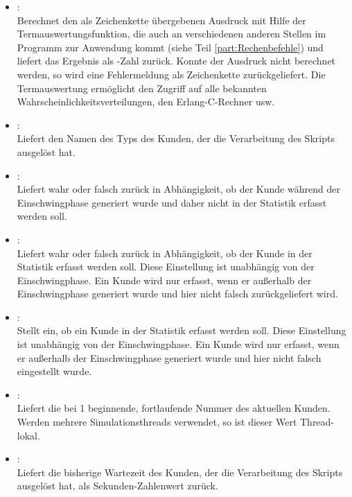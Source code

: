 \begin{itemize}

\item
{}:\\
Berechnet den als Zeichenkette übergebenen Ausdruck mit Hilfe der Termauswertungsfunktion, die
auch an verschiedenen anderen Stellen im Programm zur Anwendung kommt (siehe Teil \ref{part:Rechenbefehle}) und liefert das Ergebnis
als -Zahl zurück. Konnte der Ausdruck nicht berechnet werden, so wird eine Fehlermeldung als
Zeichenkette zurückgeliefert. Die Termauswertung ermöglicht den Zugriff auf alle bekannten
Wahrscheinlichkeitsverteilungen, den Erlang-C-Rechner usw.

\item
{}:\\
Liefert den Namen des Typs des Kunden, der die Verarbeitung des Skripts ausgelöst hat.
    
\item
{}:\\
Liefert wahr oder falsch zurück in Abhängigkeit, ob der Kunde während der Einschwingphase generiert wurde und
daher nicht in der Statistik erfasst werden soll.
  
\item
{}:\\
Liefert wahr oder falsch zurück in Abhängigkeit, ob der Kunde in der Statistik erfasst werden soll.
Diese Einstellung ist unabhängig von der Einschwingphase. Ein Kunde wird nur erfasst, wenn er außerhalb
der Einschwingphase generiert wurde und hier nicht falsch zurückgeliefert wird.
  
\item
{}:\\
Stellt ein, ob ein Kunde in der Statistik erfasst werden soll.
Diese Einstellung ist unabhängig von der Einschwingphase. Ein Kunde wird nur erfasst, wenn er außerhalb
der Einschwingphase generiert wurde und hier nicht falsch eingestellt wurde.
  
\item
{}:\\
Liefert die bei 1 beginnende, fortlaufende Nummer des aktuellen Kunden.
Werden mehrere Simulationsthreads verwendet, so ist dieser Wert Thread-lokal.
  
\item
{}:\\
Liefert die bisherige Wartezeit des Kunden, der die Verarbeitung des Skripts ausgelöst hat, als Sekunden-Zahlenwert zurück.
  

\end{itemize}
